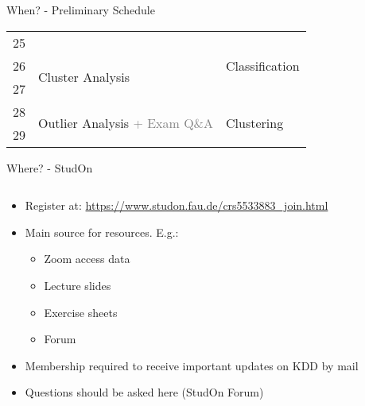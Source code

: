 \begin{frame}{When? - Preliminary Schedule}
\begin{tabular}{|p{4em}|p{25em}|p{21em}|}
		\cellcolor{faugray!25}25                    &                                                                  & \multirow{3}{*}{Classification}                              \\ \hhline{|-|-|~|}
		\cellcolor{faugray!25}26                    & \multirow{2}{*}{Cluster Analysis}                                &                                                              \\ \hhline{|-|~|}
		\cellcolor{faugray!25}27                    &                                                                  &                                                              \\ \hline
		\cellcolor{faugray!25}28                    & \multirow{2}{*}{Outlier Analysis \textcolor{gray}{+ Exam Q\&A }} & \multirow{2}{*}{Clustering}                                  \\ \hhline{|-|~|}
		\cellcolor{faugray!25}29                    &                                                                  &                                                              \\ \hline
	\end{tabular}
\end{frame}

\begin{frame}{Where? - StudOn}
	\begin{columns}
		\begin{column}{0.7\textwidth}
			\begin{itemize}
				\item Register at: \url{https://www.studon.fau.de/crs5533883_join.html}
				\item Main source for resources. E.g.:
				      \begin{itemize}
					      \item Zoom access data
					      \item Lecture slides
					      \item Exercise sheets
					      \item Forum
				      \end{itemize}
				\item Membership required to receive important updates on KDD by mail
				\item Questions should be asked here (StudOn Forum)

			\end{itemize}
		\end{column}
		\begin{column}{0.3\textwidth}
			\begin{center}
			\end{center}
		\end{column}
	\end{columns}

\end{frame}



